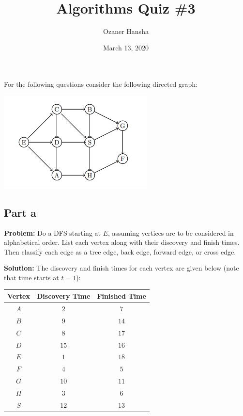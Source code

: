 \documentclass{article}
\begin{document}
\title{Algorithms Quiz \#3}
\author{Ozaner Hansha}
\date{March 13, 2020}
\maketitle

For the following questions consider the following directed graph:
\begin{center}
  \includegraphics{graph.png}
\end{center}

\subsection*{Part a}
\noindent\textbf{Problem:} Do a DFS starting at $E$, assuming vertices are to be considered in alphabetical order. List each vertex along with their discovery and finish times. Then classify each edge as a tree edge, back edge,
forward edge, or cross edge.
\bigskip

\noindent\textbf{Solution:} The discovery and finish times for each vertex are given below (note that time starts at $t=1$):
\begin{center}
  \begin{tabular}{c|c|c}
        Vertex & Discovery Time & Finished Time \\
        \hline
        $A$ & $2$ & $7$\\
        $B$ & $9$ & $14$\\
        $C$ & $8$ & $17$\\
        $D$ & $15$ & $16$\\
        $E$ & $1$ & $18$\\
        $F$ & $4$ & $5$\\
        $G$ & $10$ & $11$\\
        $H$ & $3$ & $6$\\
        $S$ & $12$ & $13$
  \end{tabular}
\end{center}
\medskip
\end{document}
